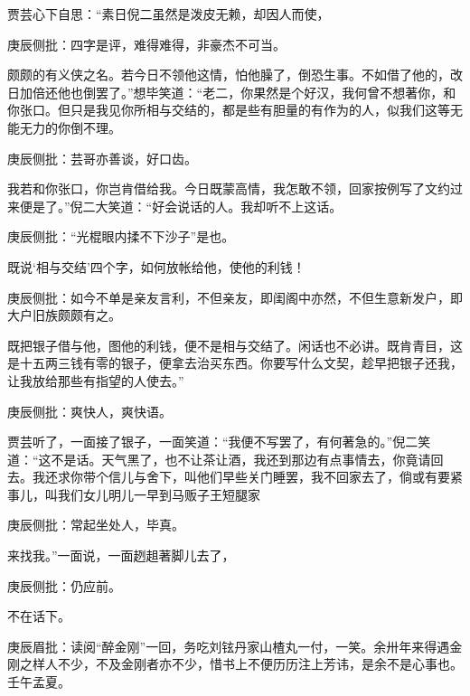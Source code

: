 \begin{parag}
    贾芸心下自思：“素日倪二虽然是泼皮无赖，却因人而使，\begin{note}庚辰侧批：四字是评，难得难得，非豪杰不可当。\end{note}颇颇的有义侠之名。若今日不领他这情，怕他臊了，倒恐生事。不如借了他的，改日加倍还他也倒罢了。”想毕笑道：“老二，你果然是个好汉，我何曾不想著你，和你张口。但只是我见你所相与交结的，都是些有胆量的有作为的人，似我们这等无能无力的你倒不理。\begin{note}庚辰侧批：芸哥亦善谈，好口齿。\end{note}我若和你张口，你岂肯借给我。今日既蒙高情，我怎敢不领，回家按例写了文约过来便是了。”倪二大笑道：“好会说话的人。我却听不上这话。\begin{note}庚辰侧批：“光棍眼内揉不下沙子”是也。\end{note}既说‘相与交结’四个字，如何放帐给他，使他的利钱！\begin{note}庚辰侧批：如今不单是亲友言利，不但亲友，即闺阁中亦然，不但生意新发户，即大户旧族颇颇有之。\end{note}既把银子借与他，图他的利钱，便不是相与交结了。闲话也不必讲。既肯青目，这是十五两三钱有零的银子，便拿去治买东西。你要写什么文契，趁早把银子还我，让我放给那些有指望的人使去。”\begin{note}庚辰侧批：爽快人，爽快语。\end{note}贾芸听了，一面接了银子，一面笑道：“我便不写罢了，有何著急的。”倪二笑道：“这不是话。天气黑了，也不让茶让酒，我还到那边有点事情去，你竟请回去。我还求你带个信儿与舍下，叫他们早些关门睡罢，我不回家去了，倘或有要紧事儿，叫我们女儿明儿一早到马贩子王短腿家\begin{note}庚辰侧批：常起坐处人，毕真。\end{note}来找我。”一面说，一面趔趄著脚儿去了，\begin{note}庚辰侧批：仍应前。\end{note}不在话下。\begin{note}庚辰眉批：读阅“醉金刚”一回，务吃刘铉丹家山楂丸一付，一笑。余卅年来得遇金刚之样人不少，不及金刚者亦不少，惜书上不便历历注上芳讳，是余不是心事也。壬午孟夏。\end{note}
\end{parag}


